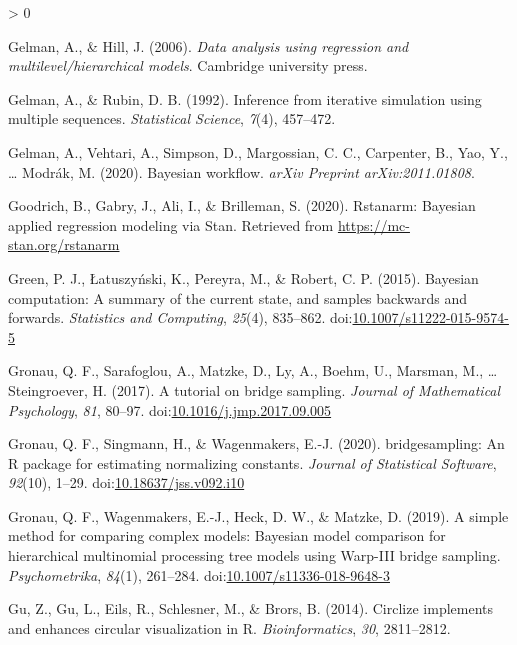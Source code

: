 \documentclass[
  english,
  doc,floatsintext]{apa6}
\newlength{\cslhangindent}
\newenvironment{CSLReferences}[2] %
 {%
  \setlength{\parindent}{0pt}
  \ifodd #1 \everypar{\setlength{\hangindent}{\cslhangindent}}\ignorespaces\fi
  \ifnum #2 > 0
  \setlength{\parskip}{#2\baselineskip}
  \fi
 }%
 {}
\begin{document}
\begin{CSLReferences}{1}{0}
\leavevmode\hypertarget{ref-gelman2006data}{}%
Gelman, A., \& Hill, J. (2006). \emph{Data analysis using regression and multilevel/hierarchical models}. Cambridge university press.

\leavevmode\hypertarget{ref-gelman1992inference}{}%
Gelman, A., \& Rubin, D. B. (1992). Inference from iterative simulation using multiple sequences. \emph{Statistical Science}, \emph{7}(4), 457--472.

\leavevmode\hypertarget{ref-gelman2020bayesian}{}%
Gelman, A., Vehtari, A., Simpson, D., Margossian, C. C., Carpenter, B., Yao, Y., \ldots{} Modrák, M. (2020). Bayesian workflow. \emph{arXiv Preprint arXiv:2011.01808}.

\leavevmode\hypertarget{ref-rstanarm2020}{}%
Goodrich, B., Gabry, J., Ali, I., \& Brilleman, S. (2020). Rstanarm: {Bayesian} applied regression modeling via {Stan}. Retrieved from \url{https://mc-stan.org/rstanarm}

\leavevmode\hypertarget{ref-green2015bayesian}{}%
Green, P. J., Łatuszyński, K., Pereyra, M., \& Robert, C. P. (2015). Bayesian computation: A summary of the current state, and samples backwards and forwards. \emph{Statistics and Computing}, \emph{25}(4), 835--862. doi:\href{https://doi.org/10.1007/s11222-015-9574-5}{10.1007/s11222-015-9574-5}

\leavevmode\hypertarget{ref-gronau2017tutorial}{}%
Gronau, Q. F., Sarafoglou, A., Matzke, D., Ly, A., Boehm, U., Marsman, M., \ldots{} Steingroever, H. (2017). A tutorial on bridge sampling. \emph{Journal of Mathematical Psychology}, \emph{81}, 80--97. doi:\href{https://doi.org/10.1016/j.jmp.2017.09.005}{10.1016/j.jmp.2017.09.005}

\leavevmode\hypertarget{ref-R-bridgesampling}{}%
Gronau, Q. F., Singmann, H., \& Wagenmakers, E.-J. (2020). {bridgesampling}: An {R} package for estimating normalizing constants. \emph{Journal of Statistical Software}, \emph{92}(10), 1--29. doi:\href{https://doi.org/10.18637/jss.v092.i10}{10.18637/jss.v092.i10}

\leavevmode\hypertarget{ref-gronau2019simple}{}%
Gronau, Q. F., Wagenmakers, E.-J., Heck, D. W., \& Matzke, D. (2019). A simple method for comparing complex models: {Bayesian} model comparison for hierarchical multinomial processing tree models using {Warp}-III bridge sampling. \emph{Psychometrika}, \emph{84}(1), 261--284. doi:\href{https://doi.org/10.1007/s11336-018-9648-3}{10.1007/s11336-018-9648-3}

\leavevmode\hypertarget{ref-R-circlize}{}%
Gu, Z., Gu, L., Eils, R., Schlesner, M., \& Brors, B. (2014). Circlize implements and enhances circular visualization in {R}. \emph{Bioinformatics}, \emph{30}, 2811--2812.


\end{CSLReferences}
\end{document}
